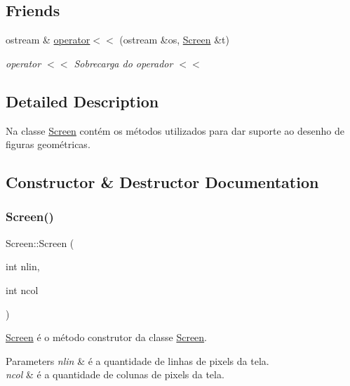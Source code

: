 \subsection*{Friends}
\begin{DoxyCompactItemize}
\item 
ostream \& \hyperlink{classScreen_aab6a2880746bfe1b7964817cc8f0989e}{operator$<$$<$} (ostream \&os, \hyperlink{classScreen}{Screen} \&t)
\begin{DoxyCompactList}\small\item\em operator $<$$<$ Sobrecarga do operador $<$$<$ \end{DoxyCompactList}\end{DoxyCompactItemize}


\subsection{Detailed Description}
Na classe \hyperlink{classScreen}{Screen} contém os métodos utilizados para dar suporte ao desenho de figuras geométricas. 

\subsection{Constructor \& Destructor Documentation}
\mbox{\label{classScreen_a246eac542489ef06335800fae60827ee}} 
\subsubsection{\texorpdfstring{Screen()}{Screen()}}
{\footnotesize\ttfamily Screen\+::\+Screen (\begin{DoxyParamCaption}\item[{int}]{nlin,  }\item[{int}]{ncol }\end{DoxyParamCaption})}



\hyperlink{classScreen}{Screen} é o método construtor da classe \hyperlink{classScreen}{Screen}. 


\begin{DoxyParams}{Parameters}
{\em nlin} & é a quantidade de linhas de pixels da tela. \\
\hline
{\em ncol} & é a quantidade de colunas de pixels da tela. \\
\hline
\end{DoxyParams}


